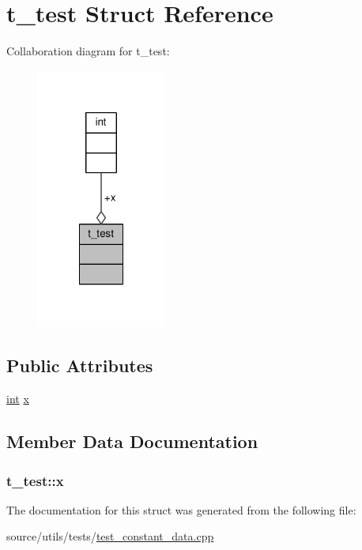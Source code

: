 \hypertarget{structt__test}{\section{t\-\_\-test Struct Reference}
\label{structt__test}
}


Collaboration diagram for t\-\_\-test\-:
\nopagebreak
\begin{figure}[H]
\begin{center}
\leavevmode
\includegraphics[width=120pt]{structt__test__coll__graph}
\end{center}
\end{figure}
\subsection*{Public Attributes}
\begin{DoxyCompactItemize}
\item 
\hyperlink{classint}{int} \hyperlink{structt__test_a660c4ef17eba9dbcfedd942d31f3a96b}{x}
\end{DoxyCompactItemize}


\subsection{Member Data Documentation}
\hypertarget{structt__test_a660c4ef17eba9dbcfedd942d31f3a96b}{
\subsubsection[{x}]{ t\-\_\-test\-::x}}\label{structt__test_a660c4ef17eba9dbcfedd942d31f3a96b}


The documentation for this struct was generated from the following file\-:\begin{DoxyCompactItemize}
\item 
source/utils/tests/\hyperlink{test__constant__data_8cpp}{test\-\_\-constant\-\_\-data.\-cpp}\end{DoxyCompactItemize}
